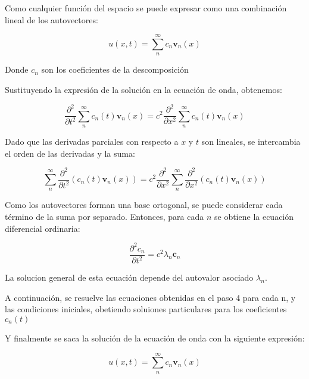 \documentclass{article}
\begin{document}
    Como cualquier función del espacio se puede expresar como una combinación lineal de los autovectores:

    \begin{equation}
        u(x, t) = \sum_{n}^{\infty} c_n \mathbf{v}_n(x)
    \end{equation} 
    
    Donde \(c_n\) son los coeficientes de la descomposición
    
    Sustituyendo la expresión de la solución en la ecuación de onda, obtenemos:

    \begin{equation}
        \frac{{\partial^2}}{{\partial t^2}}{\sum_{n}^{\infty} c_n(t) \mathbf{v}_n(x)} = c^2\frac{{\partial^2}}{{\partial x^2}}{\sum_{n}^{\infty} c_n(t) \mathbf{v}_n(x)}
    \end{equation}
    
    Dado que las derivadas parciales con respecto a $x$ y $t$ son lineales, se intercambia el orden de las derivadas y la suma:

    \begin{equation}
        {\sum_{n}^{\infty} \frac{{\partial^2}}{{\partial t^2}}(c_n(t) \mathbf{v}_n(x))} = c^2\frac{{\partial^2}}{{\partial x^2}}{\sum_{n}^{\infty}\frac{{\partial^2}}{{\partial x^2}}(c_n(t) \mathbf{v}_n(x))}
    \end{equation}
    
    Como los autovectores forman una base ortogonal, se puede considerar cada término de la suma por separado. Entonces, para cada $n$ se obtiene la ecuación diferencial ordinaria:

    \begin{equation}
        \frac{{\partial^2 c_n}}{{\partial t^2}} = c^2\lambda_n \mathbf c_n
    \end{equation}

    La solucion general de esta ecuación depende del autovalor asociado $\lambda_n$.

    A continuación, se resuelve las ecuaciones obtenidas en el paso 4 para cada n, y las condiciones iniciales, obetiendo soluiones particulares para los coeficientes $c_n(t)$

    Y finalmente se saca la solución de la ecuación de onda con la siguiente expresión:

    \begin{equation}
        u(x, t) = \sum_{n}^{\infty} c_n \mathbf{v}_n(x)
    \end{equation}
\end{document}
